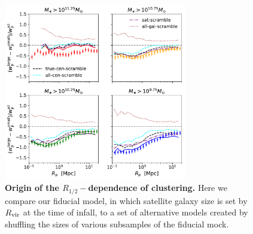 \documentclass[usenatbib,usegraphicx,letterpaper]{mn2e}
\newcommand{\rhalf}{R_{1/2}}
\newcommand{\mstar}{M_{\ast}}
\newcommand{\rvir}{R_{\rm vir}}
\newcommand{\rproj}{r_{\rm p}}
\newcommand{\wproj}{w_{\rm p}}
\newcommand{\msun}{M_\odot}
\begin{document}
\begin{figure}
\centering
\includegraphics[width=8cm]{FIGS/scrambled_size_clustering_ratios.pdf}
\caption{
{\bf Origin of the $\rhalf-$dependence of clustering.}
Here we compare our fiducial model, in which satellite galaxy size is set by $\rvir$ at the time of infall, to a set of alternative models created by shuffling the sizes of various subsamples of the fiducial mock. 
}
\label{fig:shuffle}
\end{figure}


\end{document}
